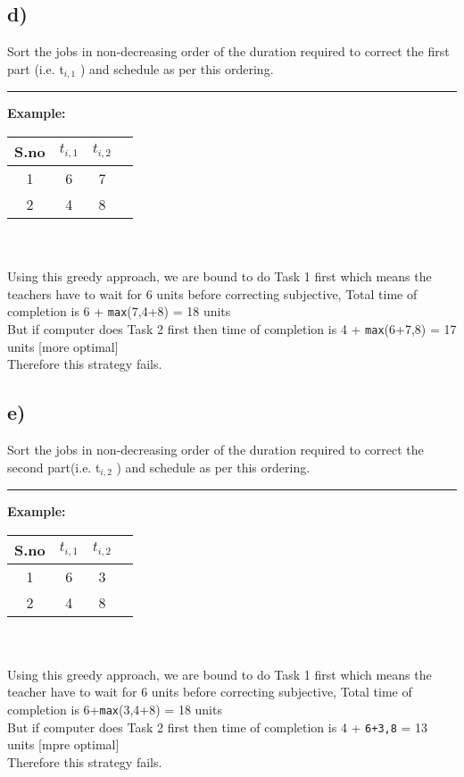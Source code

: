 \documentclass{report}
\begin{document}
 \subsection*{d)}
 Sort the jobs in non-decreasing order of the duration required to correct the first part (i.e. t$_{i,1}$ ) and schedule as per this ordering.\\
 \noindent\rule[0.5mm]{4cm}{0pt}
 \textbf{Example:}
 \begin{tabular}{|c|c|c|c}
    \hline
      S.no &  $t_{i,1}$ & $t_{i,2}$\\
      \hline
      1 & 6 & 7\\ 
      2 & 4 & 8\\
      \hline
 \end{tabular}\\\vspace*{0.2em}\\
 Using this greedy approach, we are bound to do Task 1 first which means the teachers have to wait for 6 units before correcting subjective, Total time of completion is 6 + \texttt{max}(7,4+8) = 18 units\\
 But if computer does Task 2 first then time of completion is 4 + \texttt{max}(6+7,8) = 17 units [more optimal]\\
 Therefore this strategy fails.
 \subsection*{e)}
 Sort the jobs in non-decreasing order of the duration required to correct the second part(i.e. t$_{i,2}$ ) and schedule as per this ordering.\\
 \noindent\rule[0.5mm]{4cm}{0pt}
 \textbf{Example:}
 \begin{tabular}{|c|c|c|c}
    \hline
      S.no &  $t_{i,1}$ & $t_{i,2}$\\
      \hline
      1 & 6 & 3\\ 
      2 & 4 & 8\\
      \hline
 \end{tabular}\\\vspace*{0.2em}\\
 Using this greedy approach, we are bound to do Task 1 first which means the teacher have to wait for 6 units before correcting subjective, Total time of completion is 6+\texttt{max}(3,4+8) = 18 units\\
 But if computer does Task 2 first then time of completion is 4 + \texttt{6+3,8} = 13 units [mpre optimal]\\
 Therefore this strategy fails.
 
\end{document}
